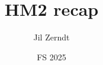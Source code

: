 \documentclass[a4paper, fontsize = 8pt, landscape]{scrartcl}
\title{HM2 recap}
\author{Jil Zerndt}
\date{FS 2025}
\begin{document}
\begin{multicols}{3}
	\thispagestyle{TitlePageStyle}
	\maketitle
	\sffamily
	
	\raggedcolumns
	\pagebreak
	
	\raggedcolumns
	\pagebreak
	
	\raggedcolumns
	\pagebreak
	
	\raggedcolumns
	\pagebreak
	
	\raggedcolumns
	\pagebreak
	
	\raggedcolumns
	\pagebreak
	
	\raggedcolumns
	\columnbreak
	
	\raggedcolumns
	\columnbreak
	
	\raggedcolumns
	\pagebreak
	
	\raggedcolumns
	\pagebreak
	
	\raggedcolumns
	\pagebreak
	
	\raggedcolumns
	
	\raggedcolumns
	\pagebreak
	
	\raggedcolumns
	\columnbreak
	
	\raggedcolumns
\end{multicols}
\end{document}
